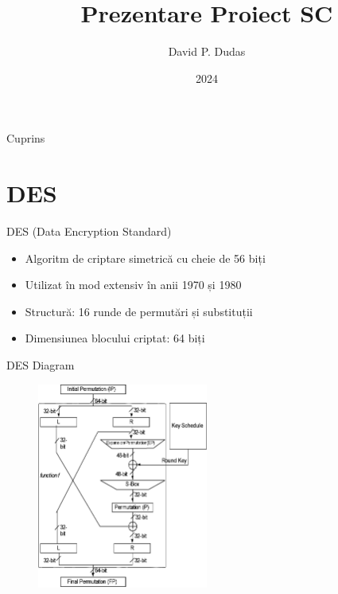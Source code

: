 \documentclass{beamer}
\title{Prezentare Proiect SC}
\author{David P. Dudas}
\date{2024}
\begin{document}
\begin{frame}
  \titlepage
\end{frame}

\begin{frame}{Cuprins}
  \tableofcontents
\end{frame}

\section{DES}

\begin{frame}{DES (Data Encryption Standard)}
  \begin{itemize}
    \item Algoritm de criptare simetrică cu cheie de 56 biți
    \item Utilizat în mod extensiv în anii 1970 și 1980
    \item Structură: 16 runde de permutări și substituții
    \item Dimensiunea blocului criptat: 64 biți
  \end{itemize}
\end{frame}

\begin{frame}{DES Diagram}
  \begin{figure}
    \centering
    \includegraphics[width=0.5\textwidth]{images/des_diagram.png}
  \end{figure}
\end{frame}
\end{document}
